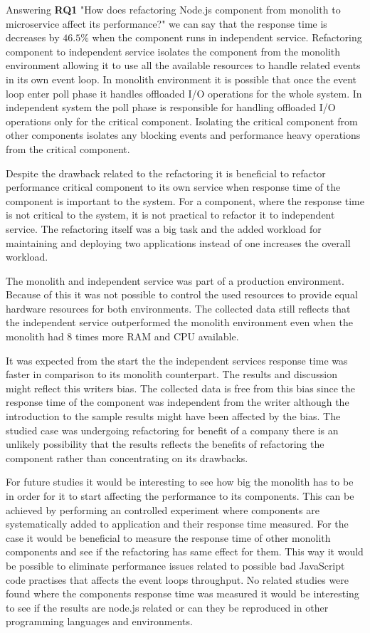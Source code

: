 Answering \textbf{RQ1} "How does refactoring Node.js component from monolith to microservice affect its performance?" we can say that the response time is decreases by $46.5\%$ when the component runs in independent service.
Refactoring component to independent service isolates the component from the monolith environment allowing it to use all the available resources to handle related events in its own event loop.
In monolith environment it is possible that once the event loop enter poll phase it handles offloaded I/O operations for the whole system.
In independent system the poll phase is responsible for handling offloaded I/O operations only for the critical component.
Isolating the critical component from other components isolates any blocking events and performance heavy operations from the critical component.

Despite the drawback related to the refactoring it is beneficial to refactor performance critical component to its own service when response time of the component is important to the system.
For a component, where the response time is not critical to the system, it is not practical to refactor it to independent service.
The refactoring itself was a big task and the added workload for maintaining and deploying two applications instead of one increases the overall workload.

The monolith and independent service was part of a production environment.
Because of this it was not possible to control the used resources to provide equal hardware resources for both environments.
The collected data still reflects that the independent service outperformed the monolith environment even when the monolith had $8$ times more RAM and CPU available.

It was expected from the start the the independent services response time was faster in comparison to its monolith counterpart.
The results and discussion might reflect this writers bias.
The collected data is free from this bias since the response time of the component was independent from the writer although the introduction to the sample results might have been affected by the bias.
The studied case was undergoing refactoring for benefit of a company there is an unlikely possibility that the results reflects the benefits of refactoring the component rather than concentrating on its drawbacks.

For future studies it would be interesting to see how big the monolith has to be in order for it to start affecting the performance to its components.
This can be achieved by performing an controlled experiment where components are systematically added to application and their response time measured.
For the case it would be beneficial to measure the response time of other monolith components and see if the refactoring has same effect for them.
This way it would be possible to eliminate  performance issues related to possible bad JavaScript code practises that affects the event loops throughput.
No related studies were found where the components response time was measured it would be interesting to see if the results are node.js related or can they be reproduced in other programming languages and environments.

